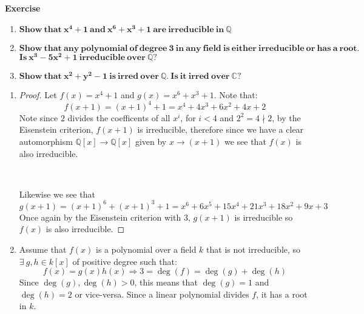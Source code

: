 \documentclass{article}
\newcommand{\C}{\mathbb{C}}
\newcommand{\Q}{\mathbb{Q}}
\theoremstyle{definition}
\theoremstyle{remark}
\theoremstyle{definition}
\newcounter{exercise}[subsection]
\newenvironment{exercise}{\setcounter{equation}{0}\refstepcounter{exercise}\textbf{Exercise~\theexercise}}{}
\begin{document}
    \begin{exercise}\begin{enumerate}[label = (\alph*)]
        \item$\mathbf{Show\ that\ x^4+1\ and\ x^6+x^3+1\ are\ irreducible\ in\ \Q}$
        \item$\mathbf{Show\ that\ any\ polynomial\ of\ degree\ 3\ in\ any\ field\ is\ either\ irreducible\ or\ has\ a\ root.}$\\
         $\mathbf{Is\ x^3-5x^2+1\ irreducible\ over\ \Q ?}$
        \item $\mathbf{Show\ that\ x^2+y^2-1\ is\ irred\ over\ \Q.\ Is\ it\ irred\ over\ \C?}$
    \end{enumerate}
        \begin{enumerate}[label= (\alph*)]
            \item \begin{proof}
            Let $f(x) = x^4+1$ and $g(x) = x^6+x^3+1$. Note that:\begin{equation}
                f(x+1) = {(x+1)}^4+1 = x^4+4x^3+6x^2+4x+2 
            \end{equation}
            Note since $2$ divides the coefficents of all $x^i$, for $i<4$ and $2^2 = 4\nmid 2$, by the Eisenstein criterion, $f(x+1)$ is irreducible, therefore since we have a clear automorphism $\Q[x]\rightarrow \Q[x]$ given by $x\rightarrow (x+1)$
            we see that $f(x)$ is also irreducible.
            
            \

            Likewise we see that \begin{equation}
                g(x+1) = {(x+1)}^6+{(x+1)}^3+1 = x^6+6x^5+15x^4+21x^3+18x^2+9x+3
            \end{equation}
        Once again by the Eisenstein criterion with 3, $g(x+1)$ is irreducible so $f(x)$ is also irreducible. 
        \end{proof}
        \item Assume that $f(x)$ is a polynomial over a field $k$ that is not irreducible, so $\exists \ g,h\in k[x]$ of positive degree such that:\begin{equation}
            f(x) = g(x)h(x) \Rightarrow 3 = \deg(f) = \deg(g)+\deg(h)
        \end{equation} 
        Since $\deg(g),\deg(h) >0$, this means that $\deg(g) = 1$ and $\deg(h) = 2$ or vice-versa. Since a linear polynomial divides $f$, it has a root in $k$.

        \


\end{enumerate}
\end{exercise}
\end{document}
